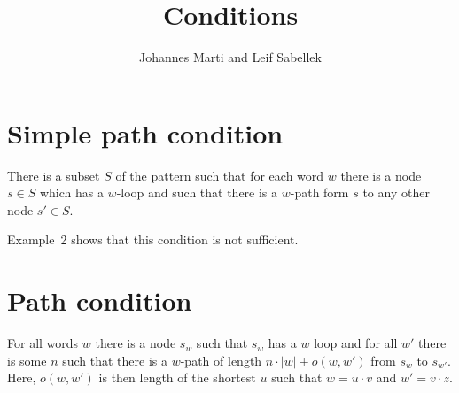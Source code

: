 \documentclass[a4paper]{article}
\title{Conditions}
\author{Johannes Marti and Leif Sabellek}
\begin{document}
\maketitle

\section{Simple path condition}

There is a subset $S$ of the pattern such that for each word $w$ there
is a node $s \in S$ which has a $w$-loop and such that there is a
$w$-path form $s$ to any other node $s' \in S$.

Example~2 shows that this condition is not sufficient.


\section{Path condition}

For all words $w$ there is a node $s_w$ such that $s_w$ has a $w$ loop
and for all $w'$ there is some $n$ such that there is a $w$-path of
length $n \cdot |w| + o(w,w')$ from $s_w$ to $s_{w'}$. Here, $o(w,w')$ is then
length of the shortest $u$ such that $w = u \cdot v$ and $w' = v \cdot
z$.



\iffalse
0011 to 010

path is of length 4n + 0

00110011001
01001001001
there is a path of lenght 9!
\fi
\end{document}
